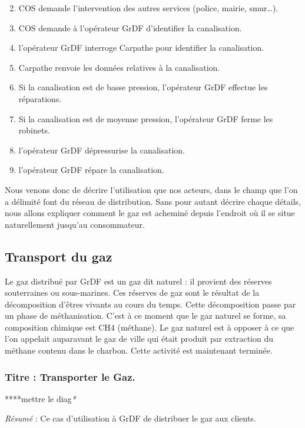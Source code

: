 \documentclass[
12pt,
french,                           %
a4paper,
]{article}
\begin{document}
\begin{enumerate}[1.]
\setcounter{enumi}{1}
\item
  COS demande l'intervention des autres services (police, mairie,
  smur\ldots{}).
\item
  COS demande à l'opérateur GrDF d'identifier la canalisation.
\item
  l'opérateur GrDF interroge Carpathe pour identifier la canalisation.
\item
  Carpathe renvoie les données relatives à la canalisation.
\item
  Si la canalisation est de basse pression, l'opérateur GrDF effectue
  les réparations.
\item
  Si la canalisation est de moyenne pression, l'opérateur GrDF ferme les
  robinets.
\item
  l'opérateur GrDF dépressurise la canalisation.
\item
  l'opérateur GrDF répare la canalisation.
\end{enumerate}

Nous venons donc de décrire l'utilisation que nos acteurs, dans le champ
que l'on a délimité font du réseau de distribution. Sans pour autant
décrire chaque détails, nous allons expliquer comment le gaz est
acheminé depuis l'endroit où il se situe naturellement jusqu'au
consommateur.

\subsection{Transport du gaz}

Le gaz distribué par GrDF est un gaz dit naturel : il provient des
réserves souterraines ou sous-marines. Ces réserves de gaz sont le
résultat de la décomposition d'êtres vivants au cours du temps. Cette
décomposition passe par un phase de méthanisation. C'est à ce moment que
le gaz naturel se forme, sa composition chimique est CH4 (méthane). Le
gaz naturel est à opposer à ce que l'on appelait auparavant le gaz de
ville qui était produit par extraction du méthane contenu dans le
charbon. Cette activité est maintenant terminée.

\subsubsection{Titre : Transporter le Gaz.}

****mettre le diag\emph{*}

\emph{Résumé} : Ce cas d'utilisation à GrDF de distribuer le gaz aux
clients.
\end{document}
